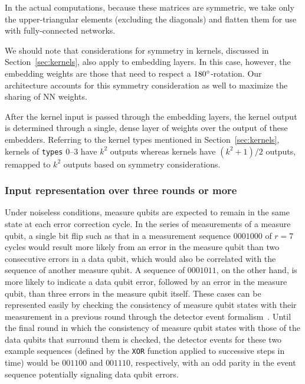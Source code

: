 In the actual computations, because these matrices are symmetric, we take only the upper-triangular elements (excluding the diagonals) and flatten them for use with fully-connected networks.

We should note that considerations for symmetry in  kernels, discussed in Section~\ref{sec:kernels}, also apply to embedding layers. In this case, however, the embedding weights are those that need to respect a $180^\circ$-rotation. Our architecture accounts for this symmetry consideration as well to maximize the sharing of NN weights.

After the kernel input is passed through the embedding layers, the kernel output is determined through a single, dense layer of weights over the output of these embedders. Referring to the kernel types mentioned in Section~\ref{sec:kernels}, kernels of \texttt{types} 0--3 have $k^2$ outputs whereas  kernels have $(k^2+1)/2$ outputs, remapped to $k^2$ outputs based on symmetry considerations.


\subsubsection{Input representation over three rounds or more}
\label{sec:kernels-r3}

Under noiseless conditions, measure qubits are expected to remain in the same state at each error correction cycle.
In the series of measurements of a measure qubit, a single bit flip such as that in a measurement sequence $0001000$ of $r=7$ cycles would result more likely from an error in the measure qubit than two consecutive errors in a data qubit, which would also be correlated with the sequence of another measure qubit.
A sequence of $0001011$, on the other hand, is more likely to indicate a data qubit error, followed by an error in the measure qubit, than three errors in the measure qubit itself.
These cases can be represented easily by checking the consistency of measure qubit states with their measurement in a previous round through the detector event formalism~\cite{Gidney:2021,Higgott:2023,Bausch:2023jgi}.
Until the final round in which the consistency of measure qubit states with those of the data qubits that surround them is checked, the detector events for these two example sequences (defined by the \texttt{XOR} function applied to successive steps in time) would be $001100$ and $001110$, respectively, with an odd parity in the event sequence potentially signaling data qubit errors.

